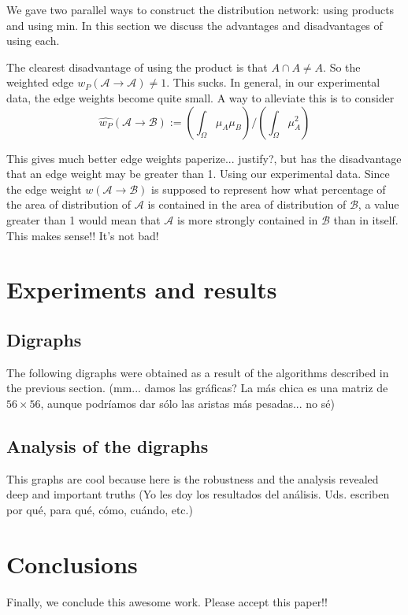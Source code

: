 \documentclass[12pt]{article}
\numberwithin{equation}{section} %
\numberwithin{figure}{section} %
\def\cA{{\mathcal{A}}}
\def\cB{{\mathcal{B}}}
\theoremstyle{definition}
\def\tcr#1{\textcolor{MyRed}{#1}}
\begin{document}
We gave two parallel ways to construct the distribution network: using products and using min. In this section we discuss the advantages and disadvantages of using each.

The clearest disadvantage of using the product is that $A\cap A \neq A$. So the weighted edge $w_P(\cA \to \cA) \neq 1$. This sucks. In general, in our experimental data, the edge weights become quite small. A way to alleviate this is to consider
	$$\widehat{w_P}(\cA \to \cB) := \left(\int_\Omega \mu_A\mu_B\right)\big/\left(\int_\Omega \mu_A^2\right)$$
	
This gives much better edge weights \tcr{paperize... justify?}, but has the disadvantage that an edge weight may be greater than 1. Using our experimental data. Since the edge weight $w(\cA \to \cB)$ is supposed to represent how what percentage of the area of distribution of $\cA$ is contained in the area of distribution of $\cB$, a value greater than 1 would mean that $\cA$ is more strongly contained in $\cB$ than in itself. This makes sense!! It's not bad!

\section{Experiments and results}

\subsection{Digraphs}
The following digraphs were obtained as a result of the algorithms described in the previous section. \tcr{(mm... damos las gráficas? La más chica es una matriz de $56\times56$, aunque podríamos dar sólo las aristas más pesadas... no sé)}

\subsection{Analysis of the digraphs}
This graphs are cool because here is the robustness and the analysis revealed deep and important truths \tcr{(Yo les doy los resultados del análisis. Uds. escriben por qué, para qué, cómo, cuándo, etc.)}



\section{Conclusions}

Finally, we conclude this awesome work. Please accept this paper!!
\end{document}
